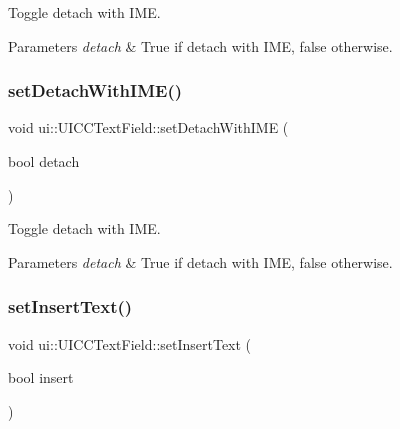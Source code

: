 Toggle detach with I\+ME. 


\begin{DoxyParams}{Parameters}
{\em detach} & True if detach with I\+ME, false otherwise. \\
\hline
\end{DoxyParams}
\mbox{\label{classui_1_1UICCTextField_a93a1fd10bfd3f6547045320b605f8987}} 
\subsubsection{\texorpdfstring{set\+Detach\+With\+I\+M\+E()}{setDetachWithIME()}\hspace{0.1cm}{\footnotesize\ttfamily [2/2]}}
{\footnotesize\ttfamily void ui\+::\+U\+I\+C\+C\+Text\+Field\+::set\+Detach\+With\+I\+ME (\begin{DoxyParamCaption}\item[{bool}]{detach }\end{DoxyParamCaption})}



Toggle detach with I\+ME. 


\begin{DoxyParams}{Parameters}
{\em detach} & True if detach with I\+ME, false otherwise. \\
\hline
\end{DoxyParams}
\mbox{\label{classui_1_1UICCTextField_a27a756bfbc4d7adbdb0015756ef399ef}} 
\subsubsection{\texorpdfstring{set\+Insert\+Text()}{setInsertText()}\hspace{0.1cm}{\footnotesize\ttfamily [1/2]}}
{\footnotesize\ttfamily void ui\+::\+U\+I\+C\+C\+Text\+Field\+::set\+Insert\+Text (\begin{DoxyParamCaption}\item[{bool}]{insert }\end{DoxyParamCaption})}



